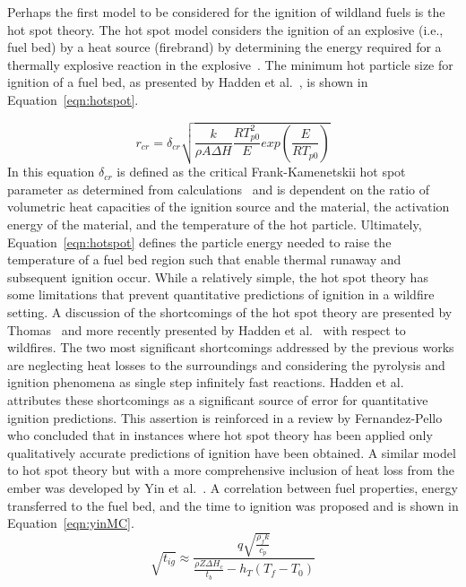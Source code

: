     Perhaps the first model to be considered for the ignition of wildland fuels is the hot spot theory. The hot spot model considers the ignition of an explosive (i.e., fuel bed) by a heat source (firebrand) by determining the energy required for a thermally explosive reaction in the explosive~\cite{Zinn1962InitiationSpots, Thomas1965}. The minimum hot particle size for ignition of a fuel bed, as presented by Hadden et al.~\cite{Hadden2011}, is shown in Equation~\ref{eqn:hotspot}.
    
        \begin{equation}
            r_{cr} = \delta_{cr}\sqrt{\frac{k}{\rho A \Delta H}\frac{RT^{2}_{p0}}{E} exp\left(\frac{E}{RT_{p0}} \right)}
            \label{eqn:hotspot}
        \end{equation}
    In this equation $\delta_{cr}$ is defined as the critical Frank-Kamenetskii hot spot parameter as determined from calculations~\cite{Goldshleger1973IgnitionDimensions} and is dependent on the ratio of volumetric heat capacities of the ignition source and the material, the activation energy of the material, and the temperature of the hot particle. Ultimately, Equation~\ref{eqn:hotspot} defines the particle energy needed to raise the temperature of a fuel bed region such that enable thermal runaway and subsequent ignition occur. While a relatively simple, the hot spot theory has some limitations that prevent quantitative predictions of ignition in a wildfire setting. A discussion of the shortcomings of the hot spot theory are presented by Thomas~\cite{Thomas1965} and more recently presented by Hadden et al.~\cite{Hadden2011} with respect to wildfires. The two most significant shortcomings addressed by the previous works are neglecting heat losses to the surroundings and considering the pyrolysis and ignition phenomena as single step infinitely fast reactions. Hadden et al. attributes these shortcomings as a significant source of error for quantitative ignition predictions. This assertion is reinforced in a review by Fernandez-Pello~\cite{Fernandez-Pello2017} who concluded that in instances where hot spot theory has been applied only qualitatively accurate predictions of ignition have been obtained. A similar model to hot spot theory but with a more comprehensive inclusion of heat loss from the ember was developed by Yin et al.~\cite{Yin2014}. A correlation between fuel properties, energy transferred to the fuel bed, and the time to ignition was proposed and is shown in Equation~\ref{eqn:yinMC}.
        \begin{equation}
            \sqrt{t_{ig}} \approx \frac{q\sqrt{\frac{\rho_{f}k}{c_{p}}}}{\frac{\rho Z \Delta H_c}{t_b}- h_T(T_f - T_0)}
            \label{eqn:yinMC}
        \end{equation}
